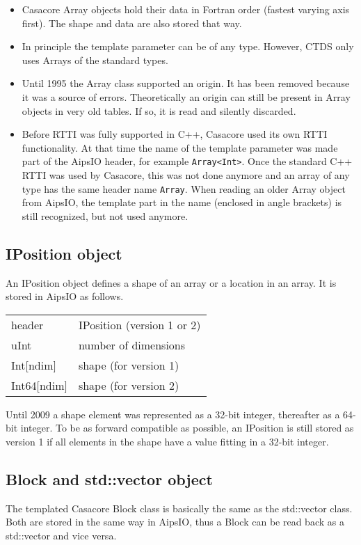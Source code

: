 \begin {itemize}
\item Casacore Array objects hold their data in Fortran order (fastest
  varying axis first). The shape and data are also stored that way.
\item In principle the template parameter can be of any
  type. However, CTDS only uses Arrays of the standard types.
\item Until 1995 the Array class supported an origin. It has been
  removed because it was a
  source of errors. Theoretically an origin can still be present in
  Array objects in very old tables. If so, it is read and silently discarded.
\item Before RTTI was fully supported in C++, Casacore used its
  own RTTI functionality. At that time the name of the template
  parameter was made part of the AipsIO header, for example
  \texttt{Array<Int>}. Once the standard C++ RTTI was used by Casacore, this was
  not done anymore and an array of any type has the same header name
  \texttt{Array}. When reading an older Array object from AipsIO, the
  template part in the name (enclosed in angle brackets) is still
  recognized, but not used anymore. 
\end {itemize}


\subsection{IPosition object}
An IPosition object defines a shape of an array or a location in an array.
It is stored in AipsIO as follows.

\vspace{0.15in}
\begin{tabular}{|l|p{13cm}|} \hline
  header & IPosition (version 1 or 2) \\
  uInt & number of dimensions \\
  Int[ndim] & shape (for version 1) \\
  Int64[ndim] & shape (for version 2) \\
  \hline
\end{tabular}
\vspace{0.15in}

Until 2009 a shape element was represented as a 32-bit integer,
thereafter as a 64-bit integer. To be as forward compatible as
possible, an IPosition is still stored as version 1 if all elements in
the shape have a value fitting in a 32-bit integer.


\subsection{Block and std::vector object}
The templated Casacore Block class is basically the same as the std::vector
class.
Both are stored in the same way in AipsIO, thus a Block can be read
back as a std::vector and vice versa. 

